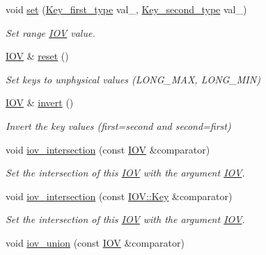 \begin{DoxyCompactItemize}
void \hyperlink{class_d_d4hep_1_1_i_o_v_ab1157ed01d8a99029c6d2cfc9379ac9b}{set} (\hyperlink{class_d_d4hep_1_1_i_o_v_a3f518f6b507c82c4ee614e52b3519325}{Key\+\_\+first\+\_\+type} val\+\_, \hyperlink{class_d_d4hep_1_1_i_o_v_ae1e4d1584dcc17a416008a93d94376b5}{Key\+\_\+second\+\_\+type} val\+\_)
\begin{DoxyCompactList}\small\item\em Set range \hyperlink{class_d_d4hep_1_1_i_o_v}{I\+OV} value. \end{DoxyCompactList}\item 
\hyperlink{class_d_d4hep_1_1_i_o_v}{I\+OV} \& \hyperlink{class_d_d4hep_1_1_i_o_v_acbc1f282468528fd38d471bf7f9d58c0}{reset} ()
\begin{DoxyCompactList}\small\item\em Set keys to unphysical values (L\+O\+N\+G\+\_\+\+M\+AX, L\+O\+N\+G\+\_\+\+M\+IN) \end{DoxyCompactList}\item 
\hyperlink{class_d_d4hep_1_1_i_o_v}{I\+OV} \& \hyperlink{class_d_d4hep_1_1_i_o_v_a5407ab1da0910ee18ca80dfa6985d0af}{invert} ()
\begin{DoxyCompactList}\small\item\em Invert the key values (first=second and second=first) \end{DoxyCompactList}\item 
void \hyperlink{class_d_d4hep_1_1_i_o_v_ae6f8261feefa4678c0842d43946d146d}{iov\+\_\+intersection} (const \hyperlink{class_d_d4hep_1_1_i_o_v}{I\+OV} \&comparator)
\begin{DoxyCompactList}\small\item\em Set the intersection of this \hyperlink{class_d_d4hep_1_1_i_o_v}{I\+OV} with the argument \hyperlink{class_d_d4hep_1_1_i_o_v}{I\+OV}. \end{DoxyCompactList}\item 
void \hyperlink{class_d_d4hep_1_1_i_o_v_ab045b2ff365c11e6ff93c4ca01270a49}{iov\+\_\+intersection} (const \hyperlink{class_d_d4hep_1_1_i_o_v_a07cb46dc875296dc9cccf4ff370104ae}{I\+O\+V\+::\+Key} \&comparator)
\begin{DoxyCompactList}\small\item\em Set the intersection of this \hyperlink{class_d_d4hep_1_1_i_o_v}{I\+OV} with the argument \hyperlink{class_d_d4hep_1_1_i_o_v}{I\+OV}. \end{DoxyCompactList}\item 
void \hyperlink{class_d_d4hep_1_1_i_o_v_aa0261c65bd7ffa708862bdd0e69845d9}{iov\+\_\+union} (const \hyperlink{class_d_d4hep_1_1_i_o_v}{I\+OV} \&comparator)

\end{DoxyCompactItemize}

